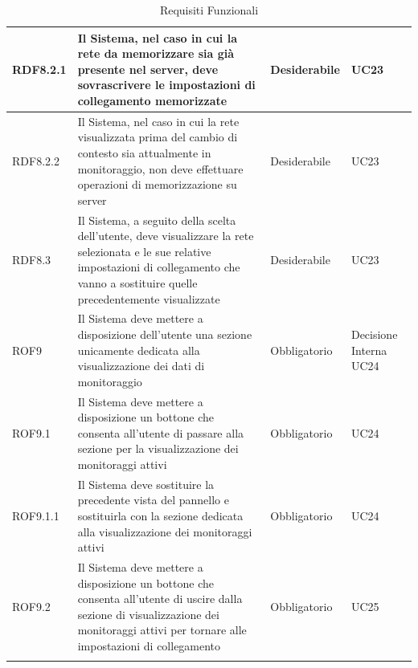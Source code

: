 \begin{center}
\begin{longtable}[c]{|m{}|m{}|m{}|m{}|}
\hline
RDF8.2.1 & Il Sistema, nel caso in cui la rete da memorizzare sia già presente nel server, deve sovrascrivere le impostazioni di collegamento memorizzate & Desiderabile & UC23\\
\hline
RDF8.2.2 & Il Sistema, nel caso in cui la rete visualizzata prima del cambio di contesto sia attualmente in monitoraggio, non deve effettuare operazioni di memorizzazione su server & Desiderabile & UC23\\
\hline
RDF8.3 & Il Sistema, a seguito della scelta dell'utente, deve visualizzare la rete selezionata e le sue relative impostazioni di collegamento che vanno a sostituire quelle precedentemente visualizzate & Desiderabile & UC23\\
\hline
ROF9 & Il Sistema deve mettere a disposizione dell'utente una sezione unicamente dedicata alla visualizzazione dei dati di monitoraggio & Obbligatorio & Decisione Interna UC24\\
\hline
ROF9.1 & Il Sistema deve mettere a disposizione un bottone che consenta all'utente di passare alla sezione per la visualizzazione dei monitoraggi attivi & Obbligatorio & UC24\\
\hline
ROF9.1.1 & Il Sistema deve sostituire la precedente vista del pannello e sostituirla con la sezione dedicata alla visualizzazione dei monitoraggi attivi & Obbligatorio & UC24\\
\hline
ROF9.2 & Il Sistema deve mettere a disposizione un bottone che consenta all'utente di uscire dalla sezione di visualizzazione dei monitoraggi attivi per tornare alle impostazioni di collegamento  & Obbligatorio & UC25\\
\hline
\caption{Requisiti Funzionali}
\end{longtable}
\end{center}


